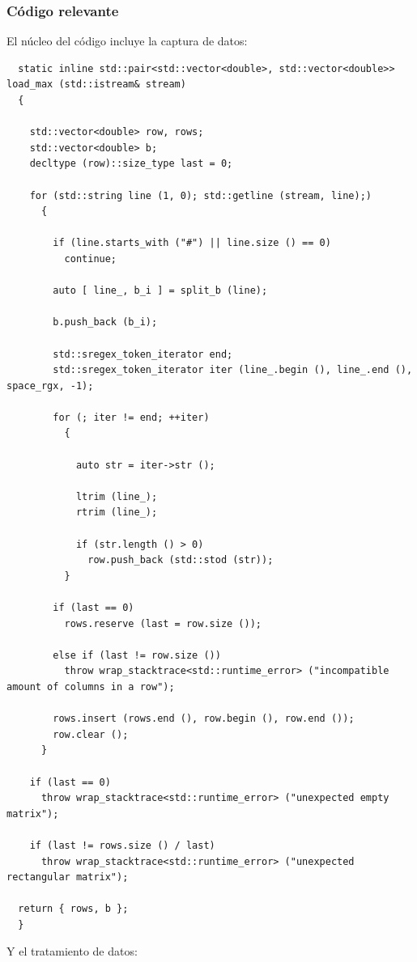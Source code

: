 \documentclass{article}[12pt,a4paper]
\begin{document}
\subsubsection{Código relevante}

El núcleo del código incluye la captura de datos:

\begin{verbatim}
  static inline std::pair<std::vector<double>, std::vector<double>> load_max (std::istream& stream)
  {

    std::vector<double> row, rows;
    std::vector<double> b;
    decltype (row)::size_type last = 0;

    for (std::string line (1, 0); std::getline (stream, line);)
      {

        if (line.starts_with ("#") || line.size () == 0)
          continue;

        auto [ line_, b_i ] = split_b (line);

        b.push_back (b_i);

        std::sregex_token_iterator end;
        std::sregex_token_iterator iter (line_.begin (), line_.end (), space_rgx, -1);

        for (; iter != end; ++iter)
          {

            auto str = iter->str ();

            ltrim (line_);
            rtrim (line_);

            if (str.length () > 0)
              row.push_back (std::stod (str));
          }

        if (last == 0)
          rows.reserve (last = row.size ());

        else if (last != row.size ())
          throw wrap_stacktrace<std::runtime_error> ("incompatible amount of columns in a row");

        rows.insert (rows.end (), row.begin (), row.end ());
        row.clear ();
      }

    if (last == 0)
      throw wrap_stacktrace<std::runtime_error> ("unexpected empty matrix");

    if (last != rows.size () / last)
      throw wrap_stacktrace<std::runtime_error> ("unexpected rectangular matrix");

  return { rows, b };
  }
\end{verbatim}

Y el tratamiento de datos:
\end{document}
